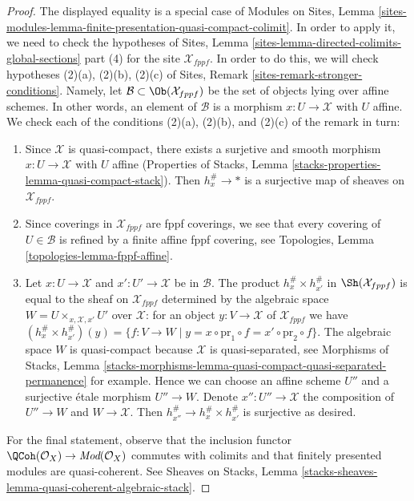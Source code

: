 \begin{proof}
The displayed equality is a special case of Modules on Sites, Lemma
\ref{sites-modules-lemma-finite-presentation-quasi-compact-colimit}.
In order to apply it, we need to check the hypotheses of
Sites, Lemma \ref{sites-lemma-directed-colimits-global-sections} part (4)
for the site $\mathcal{X}_{fppf}$. In order to do this, we will check
hypotheses (2)(a), (2)(b), (2)(c) of
Sites, Remark \ref{sites-remark-stronger-conditions}.
Namely, let $\mathcal{B} \subset \Ob(\mathcal{X}_{fppf})$ be the set
of objects lying over affine schemes. In other words, an element
of $\mathcal{B}$ is a morphism $x : U \to \mathcal{X}$ with $U$ affine.
We check each of the conditions (2)(a), (2)(b), and (2)(c)
of the remark in turn:
\begin{enumerate}
\item Since $\mathcal{X}$ is quasi-compact, there exists a
surjetive and smooth morphism $x : U \to \mathcal{X}$ with $U$ affine
(Properties of Stacks, Lemma
\ref{stacks-properties-lemma-quasi-compact-stack}).
Then $h_x^\# \to *$ is a surjective map of sheaves on $\mathcal{X}_{fppf}$.
\item Since coverings in $\mathcal{X}_{fppf}$ are fppf
coverings, we see that every covering of $U \in \mathcal{B}$ is refined
by a finite affine fppf covering, see
Topologies, Lemma \ref{topologies-lemma-fppf-affine}.
\item Let $x : U \to \mathcal{X}$ and $x' : U' \to \mathcal{X}$ be
in $\mathcal{B}$. The product $h_x^\# \times h_{x'}^\#$ in
$\Sh(\mathcal{X}_{fppf})$ is equal to the sheaf on $\mathcal{X}_{fppf}$
determined by the algebraic space $W = U \times_{x, \mathcal{X}, x'} U'$ over
$\mathcal{X}$: for an object $y : V \to \mathcal{X}$ of
$\mathcal{X}_{fppf}$ we have
$(h_x^\# \times h_{x'}^\#)(y) = \{f : V \to W \mid y =
x \circ \text{pr}_1 \circ f = x' \circ \text{pr}_2 \circ f\}$.
The algebraic space $W$ is quasi-compact because $\mathcal{X}$
is quasi-separated, see Morphisms of Stacks, Lemma
\ref{stacks-morphisms-lemma-quasi-compact-quasi-separated-permanence}
for example. Hence we can choose an affine scheme $U''$ and
a surjective \'etale morphism $U'' \to W$. Denote $x'' : U'' \to \mathcal{X}$
the composition of $U'' \to W$ and $W \to \mathcal{X}$. Then
$h_{x''}^\# \to h_x^\# \times h_{x'}^\#$ is surjective as desired.
\end{enumerate}
For the final statement, observe that the inclusion functor
$\QCoh(\mathcal{O}_X) \to \textit{Mod}(\mathcal{O}_X)$
commutes with colimits and that finitely presented modules
are quasi-coherent. See Sheaves on Stacks, Lemma
\ref{stacks-sheaves-lemma-quasi-coherent-algebraic-stack}.
\end{proof}



